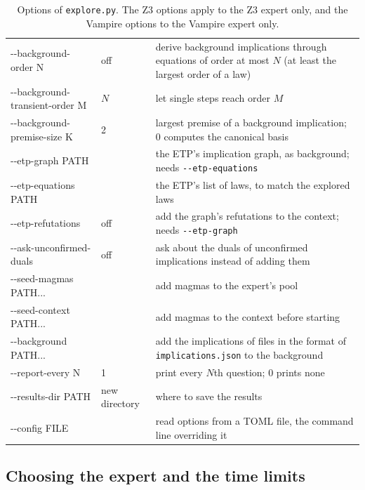 \documentclass[11pt,a4paper]{article}
\theoremstyle{definition}
\theoremstyle{remark}
\newcommand{\code}[1]{\texttt{#1}}
\begin{document}
\begin{table}[ht]
\begin{tabularx}{\textwidth}{@{}>{\ttfamily}l l X@{}}
-{}-background-order N & off & derive background implications through equations of order at most $N$ (at least the largest order of a law) \\
-{}-background-transient-order M & $N$ & let single steps reach order $M$ \\
-{}-background-premise-size K & 2 & largest premise of a background implication; $0$ computes the canonical basis \\
-{}-etp-graph PATH & & the ETP's implication graph, as background; needs \code{-{}-etp-equations} \\
-{}-etp-equations PATH & & the ETP's list of laws, to match the explored laws \\
-{}-etp-refutations & off & add the graph's refutations to the context; needs \code{-{}-etp-graph} \\
-{}-ask-unconfirmed-duals & off & ask about the duals of unconfirmed implications instead of adding them \\
-{}-seed-magmas PATH... & & add magmas to the expert's pool \\
-{}-seed-context PATH... & & add magmas to the context before starting \\
-{}-background PATH... & & add the implications of files in the format of \code{implications.json} to the background \\
-{}-report-every N & 1 & print every $N$th question; $0$ prints none \\
-{}-results-dir PATH & new directory & where to save the results \\
-{}-config FILE & & read options from a TOML file, the command line overriding it \\
\bottomrule
\end{tabularx}
\caption{Options of \code{explore.py}. The Z3 options apply to the Z3 expert only, and the Vampire options to the Vampire expert only.}\label{tab:options}
\end{table}

\subsection{Choosing the expert and the time limits}
\end{document}
